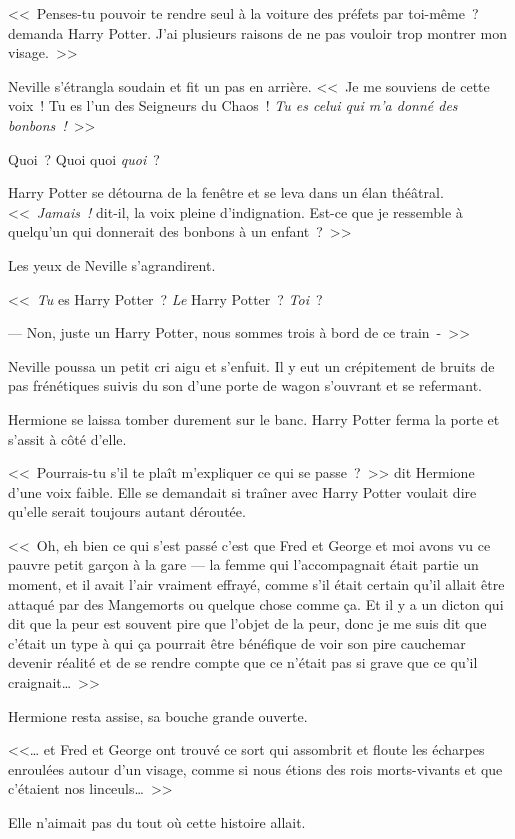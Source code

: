 <<~Penses-tu pouvoir te rendre seul à la voiture des préfets par toi-même~? demanda Harry Potter. J'ai plusieurs raisons de ne pas vouloir trop montrer mon visage.~>>

Neville s'étrangla soudain et fit un pas en arrière. <<~Je me souviens de cette voix~! Tu es l'un des Seigneurs du Chaos~! \emph{Tu es celui qui m'a donné des bonbons~!}~>>

Quoi~? Quoi quoi \emph{quoi}~?

Harry Potter se détourna de la fenêtre et se leva dans un élan théâtral. <<~\emph{Jamais~!} dit-il, la voix pleine d'indignation. Est-ce que je ressemble à quelqu'un qui donnerait des bonbons à un enfant~?~>>

Les yeux de Neville s'agrandirent.

<<~\emph{Tu} es Harry Potter~? \emph{Le} Harry Potter~? \emph{Toi}~?

--- Non, juste un Harry Potter, nous sommes trois à bord de ce train~-~>>

Neville poussa un petit cri aigu et s'enfuit. Il y eut un crépitement de bruits de pas frénétiques suivis du son d'une porte de wagon s'ouvrant et se refermant.

Hermione se laissa tomber durement sur le banc. Harry Potter ferma la porte et s'assit à côté d'elle.

<<~Pourrais-tu s'il te plaît m'expliquer ce qui se passe~?~>> dit Hermione d'une voix faible. Elle se demandait si traîner avec Harry Potter voulait dire qu'elle serait toujours autant déroutée.

<<~Oh, eh bien ce qui s'est passé c'est que Fred et George et moi avons vu ce pauvre petit garçon à la gare — la femme qui l'accompagnait était partie un moment, et il avait l'air vraiment effrayé, comme s'il était certain qu'il allait être attaqué par des Mangemorts ou quelque chose comme ça. Et il y a un dicton qui dit que la peur est souvent pire que l'objet de la peur, donc je me suis dit que c'était un type à qui ça pourrait être bénéfique de voir son pire cauchemar devenir réalité et de se rendre compte que ce n'était pas si grave que ce qu'il craignait…~>>

Hermione resta assise, sa bouche grande ouverte.

<<… et Fred et George ont trouvé ce sort qui assombrit et floute les écharpes enroulées autour d'un visage, comme si nous étions des rois morts-vivants et que c'étaient nos linceuls…~>>

Elle n'aimait pas du tout où cette histoire allait.

